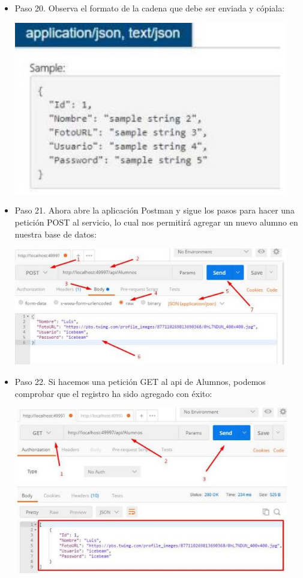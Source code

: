 \begin{flushleft}
\begin{itemize}
\item Paso 20. Observa el formato de la cadena que debe ser enviada y cópiala:
\begin{center}
	\includegraphics[width=12cm]{./Imagenes/paso20} 
	\end{center}

\item Paso 21. Ahora abre la aplicación Postman y sigue los pasos para hacer una petición POST al servicio, lo
cual nos permitirá agregar un nuevo alumno en nuestra base de datos: 
\begin{center}
	\includegraphics[width=12cm]{./Imagenes/paso21} 
	\end{center}

\item Paso 22. Si hacemos una petición GET al api de Alumnos, podemos comprobar que el registro ha sido
agregado con éxito:
\begin{center}
	\includegraphics[width=12cm]{./Imagenes/paso22} 
	\end{center}



\end{itemize}
\end{flushleft}
